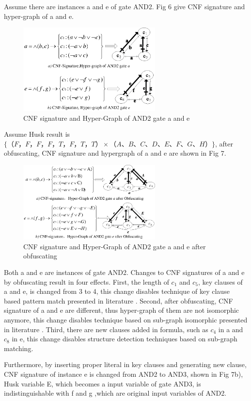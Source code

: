 \documentclass[runningheads,a4paper]{llncs}
\begin{document}
\setlength{\parindent}{2em} 
Assume there are instances a and e of gate AND2. Fig 6 give CNF signature and hyper-graph of a and e.
\begin{figure}
\centering
\includegraphics[width=7.2cm]{a6}
\caption{CNF signature and Hyper-Graph of AND2 gate a and e}
\end{figure}
Assume Husk result is $\{（F，F，F，F，T，F，T，T）\times（A、B、C、D、E、F、G、H）\}$, after obfuscating, CNF signature and hypergraph of a and e are shown in Fig 7.
\begin{figure}
\centering
\includegraphics[width=7.2cm]{a7}
\caption{CNF signature and Hyper-Graph of AND2 gate a and e after obfuscating}
\end{figure}
Both a and e are instances of gate AND2. Changes to CNF signatures of a and e by obfuscating result in four effects.
First, the length of $c_1$ and $c_5$, key clauses of a and e, is changed from 3 to 4, this change disables technique of key clause based pattern match presented in literature \cite{t9}.
Second, after obfuscating, CNF signature of a and e are different, thus hyper-graph of them are not isomorphic anymore, 
this change disables technique based on sub-graph isomorphic presented in literature \cite{t8}.
Third, there are new clauses added in formula, such as $c_4$ in a and $c_8$ in e, this change disables structure detection techniques based on sub-graph matching. 

Furthermore, by inserting proper literal in key clauses and generating new clause, CNF signature of instance e is changed from AND2 to AND3, shown in Fig 7b),
Husk variable E, which becomes a input variable of gate AND3, is indistinguishable with f and g ,which are original input variables of AND2.
\end{document}
